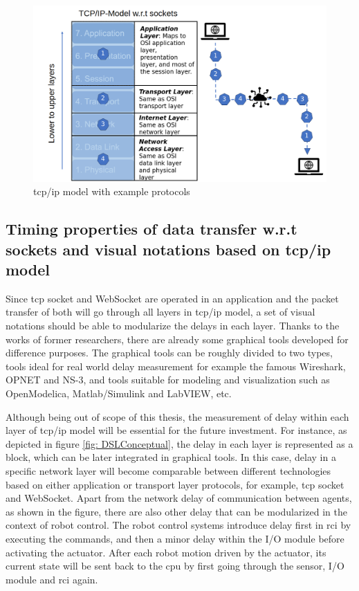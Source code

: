 \begin{figure}[htb]
    \includegraphics[width=\textwidth]{figures/TCP_IP.png}
    
    \centering
    \caption{\gls{tcp/ip} model with example protocols \label{fig: TCP_IP}}
\end{figure}

\subsection{Timing properties of data transfer w.r.t sockets and visual notations based on \gls{tcp/ip} model}
Since \gls{tcp} socket and WebSocket are operated in an application 
and the packet transfer of both will go through all layers in \gls{tcp/ip} model, 
a set of visual notations should be able to modularize the delays in each layer.
Thanks to the works of former researchers, there are already some graphical 
tools developed for difference purposes. The graphical tools 
can be roughly divided to two types, tools ideal for real world delay measurement 
for example the famous Wireshark, OPNET and NS-3, 
and tools suitable for modeling and visualization such as OpenModelica, 
Matlab/Simulink and LabVIEW, etc.



Although being out of scope of this thesis, the measurement of delay within 
each layer of \gls{tcp/ip} model will be essential for the future investment.
For instance, as depicted in figure \ref{fig: DSLConceptual}, the delay in 
each layer is represented as a block, which can be later integrated in graphical tools.
In this case, delay in a specific network layer will become comparable between
different technologies based on either application or transport layer protocols,
for example, \gls{tcp} socket and WebSocket. Apart from the network delay of
communication between agents, as shown in the figure, there are also other 
delay that can be modularized in the context of robot control. The robot 
control systems introduce delay first in \gls{rci} by executing the commands, 
and then a minor delay within the I/O module before activating the actuator.
After each robot motion driven by the actuator, its current state will be sent 
back to the \gls{cpu} by first going through the sensor, I/O module and \gls{rci} 
again. 







